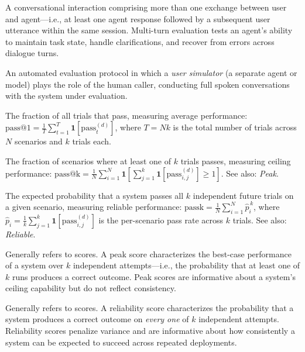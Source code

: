\begin{description}[leftmargin=2.2cm, labelwidth=2cm, labelsep=0.2cm, style=nextline]
  \item[\textbf{Multi-turn}] A conversational interaction comprising more than one exchange between user and agent---i.e., at least one agent response followed by a subsequent user utterance within the same session. Multi-turn evaluation tests an agent's ability to maintain task state, handle clarifications, and recover from errors across dialogue turns. \label{def:multi-turn}

  \item[\textbf{Bot-to-Bot}] An automated evaluation protocol in which a \textit{user simulator} (a separate agent or model) plays the role of the human caller, conducting full spoken conversations with the system under evaluation.  \label{def:bot-to-bot}


\item[\textbf{pass@1}] The fraction of all trials that pass, measuring average performance: $\text{pass@1} = \frac{1}{T}\sum_{t=1}^{T} \mathbf{1}[\text{pass}^{(d)}_t]$, where $T = Nk$ is the total number of trials across $N$ scenarios and $k$ trials each.  \label{def:passatone}

  \item[\textbf{pass@k}] The fraction of scenarios where at least one of $k$ trials passes, measuring ceiling performance: $\text{pass@k} = \frac{1}{N}\sum_{i=1}^{N} \mathbf{1}\!\left[\sum_{j=1}^{k} \mathbf{1}[\text{pass}^{(d)}_{i,j}] \geq 1\right]$. See also: \textit{Peak}. \label{def:passatk}

  \item[\textbf{pass\^{}k}] The expected probability that a system passes all $k$ independent future trials on a given scenario, measuring reliable performance: $\text{pass\^{}k} = \frac{1}{N}\sum_{i=1}^{N} \hat{p}_i^{\,k}$, where $\hat{p}_i = \frac{1}{k}\sum_{j=1}^{k} \mathbf{1}[\text{pass}^{(d)}_{i,j}]$ is the per-scenario pass rate across $k$ trials. See also: \textit{Reliable}. \label{def:passpowerk}


    \item[\textbf{Peak}] Generally refers to \textit{\passatk} scores. A peak score characterizes the best-case performance of a system over $k$ independent attempts---i.e., the probability that at least one of $k$ runs produces a correct outcome. Peak scores are informative about a system's ceiling capability but do not reflect consistency.  \label{def:peak}

  \item[\textbf{Reliable}] Generally refers to \textit{\passpowerk} scores. A reliability score characterizes the probability that a system produces a correct outcome on \textit{every one} of $k$ independent attempts. Reliability scores penalize variance and are informative about how consistently a system can be expected to succeed across repeated deployments.  \label{def:reliable}


\end{description}
